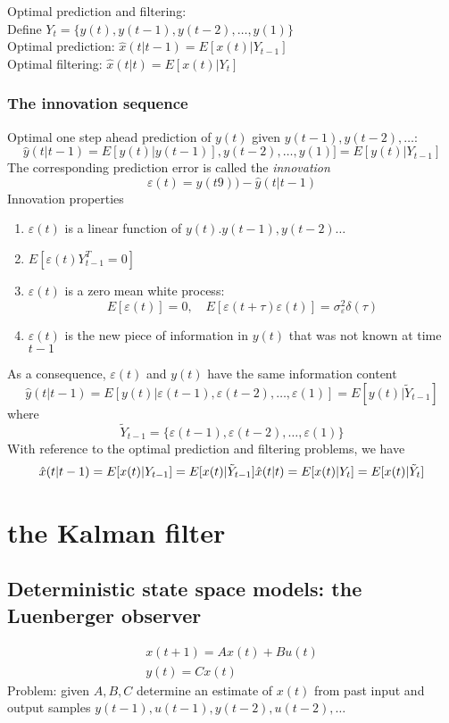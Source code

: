 \documentclass{book}
\begin{document}
Optimal prediction and filtering:\\
Define $Y_t = \{y(t),y(t-1),y(t-2),\dots,y(1)\}$\\
Optimal prediction: $\hat{x}(t|t-1)=E[x(t)|Y_{t-1}]$\\
Optimal filtering: $\hat{x}(t|t)=E[x(t)|Y_t]$

\subsubsection{The innovation sequence}
Optimal one step ahead prediction of $y(t)$ given $y(t-1),y(t-2),\dots$:
\[
    \hat{y}(t|t-1)=E[y(t)|y(t-1)],y(t-2),\dots,y(1)]=E[y(t)|Y_{t-1}]
\]
The corresponding prediction error is called the \emph{innovation}
\[
    \varepsilon(t)=y(t9))-\hat{y}(t|t-1)
\]
Innovation properties 
\begin{enumerate}
    \item $\varepsilon(t)$ is a linear function of $y(t).y(t-1),y(t-2)\dots$
    \item $E[\varepsilon(t)Y^T_{t-1}=0]$
    \item $\varepsilon(t)$ is a zero mean white process: 
        \[
            E[\varepsilon(t)]=0, \quad E[\varepsilon(t+\tau)\varepsilon(t)]=\sigma_\varepsilon^2\delta(\tau)
        \]
    \item $\varepsilon(t)$ is the new piece of information in $y(t)$ that was not known at time $t-1$
\end{enumerate}
As a consequence, $\varepsilon(t)$ and $y(t)$ have the same information content 
\[
    \hat{y}(t|t-1)=E[y(t)|\varepsilon(t-1),\varepsilon(t-2),\dots,\varepsilon(1)]=E[y(t)|\tilde{Y}_{t-1}]
\]
where
\[
    \tilde{Y}_{t-1}=\{\varepsilon(t-1),\varepsilon(t-2),\dots,\varepsilon(1)\}
\]
With reference to the optimal prediction and  filtering problems, we have 
\[
    \hat{x}(t|t-1)=E[x(t)|Y_{t-1}]=E[x(t)|\tilde{Y}_{t-1}]\\
    \hat{x}(t|t) = E[x(t)|Y_t]=E[x(t)|\tilde{Y}_t]
\]

\section{the Kalman filter}
\subsection{Deterministic state space models: the Luenberger observer}
\begin{gather*}
    x(t+1)=Ax(t)+Bu(t)\\
    y(t)=Cx(t)
\end{gather*}
Problem: given $A,B,C$ determine an estimate of $x(t)$ from past input and output samples $y(t-1),u(t-1),y(t-2),u(t-2),\dots$
\end{document}
